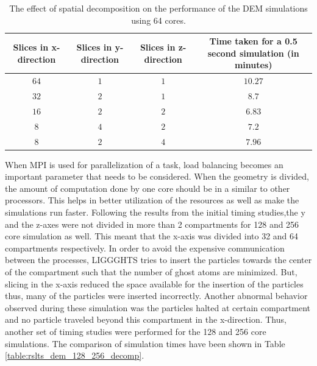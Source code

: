 \documentclass[preprint,11pt,authoryear]{elsarticle}
\begin{document}
\begin{table}
\caption{The effect of spatial decomposition on the performance of the DEM simulations using 64 cores.}
\label{table:rslts_dem_slicing_studies}
\begin{center}
\begin{tabulary}{\linewidth}{C|C|C|C}
  
\hline
\bf{Slices in x-direction}&\bf{Slices in y-direction}&\bf{Slices in z-direction}& \bf{Time taken for a 0.5 
second simulation (in minutes)}\\
\hline
$64$ & $1$ & $1$ & $10.27$\\
$32$ & $2$ & $1$ & $8.7$\\
$16$ & $2$ & $2$ & $6.83$\\
$8$ & $4$ & $2$ & $7.2$\\		  
$8$ & $2$ & $4$ & $7.96$\\
\hline  		  
\end{tabulary}
\end{center}
      
\end{table}

When MPI is used for parallelization of a task, load balancing becomes an important parameter 
that needs to be considered. When the geometry is divided, the amount of computation done by one core
should be in a similar to other processors. This helps in better utilization of the resources as well as
make the simulations run faster. Following the results from the initial timing studies,the y 
and the z-axes were not divided in more than 2 compartments for 128 and 256 core simulation as well. 
This meant that the x-axis was divided into 32 and 64 compartments respectively. In order to avoid the 
expensive communication between the processes, LIGGGHTS tries to insert the particles towards the 
center of the compartment such that the number of ghost atoms are minimized. But, slicing in the 
x-axis reduced the space available for the insertion of the particles thus, many of the particles were 
inserted incorrectly. Another abnormal behavior observed during these simulation was the particles 
halted at certain compartment and no particle traveled beyond this compartment in the x-direction. 
Thus, another set of timing studies were performed for the 128 and 256 core simulations. The 
comparison of simulation times have been shown in Table \ref{table:rslts_dem_128_256_decomp}.
\end{document}
